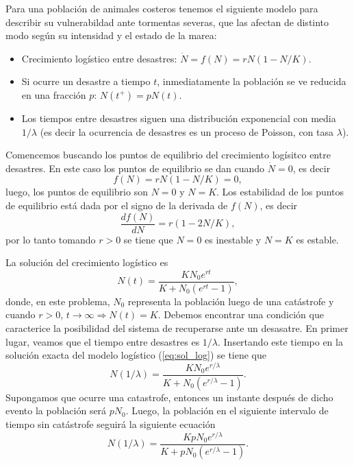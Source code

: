 \documentclass[letterpaper,12pt]{article}
\theoremstyle{plain}
\begin{document}
Para una población de animales costeros tenemos el siguiente modelo para describir su vulnerabildad ante tormentas severas, que las afectan de distinto modo según su intensidad y el estado de la marea:
\begin{itemize}
    \item Crecimiento logístico entre desastres: $ \dot{N} = f(N) = rN(1 - N/K)$.
    \item Si ocurre un desastre a tiempo $t$, inmediatamente la población se ve reducida en una fracción $p$: $N(t^+) = pN(t)$.
    \item Los tiempos entre desastres siguen una distribución exponencial con media $1/\lambda$ (es decir la ocurrencia de desastres es un proceso de Poisson, con tasa $\lambda$).
\end{itemize}
Comencemos buscando los puntos de equilibrio del crecimiento logísitco entre desastres. En este caso los puntos de equilibrio se dan cuando $\dot{N} = 0$, es decir
\begin{equation}
    f(N) = rN(1 - N/K) = 0,
\end{equation}
luego, los puntos de equilibrio son $N=0$ y $N=K$. Los estabilidad de los puntos de equilibrio está dada por el signo de la derivada de $f(N)$, es decir    
\begin{equation}
    \frac{d f(N)}{d N} = r(1 - 2N/K), 
\end{equation}
por lo tanto tomando $r>0$ se tiene que $N=0$ es inestable y $N=K$ es estable. 

La solución del crecimiento logístico es
\begin{equation}
    N(t) = \frac{K N_0 e^{rt}}{K + N_0(e^{rt} - 1)},
    \label{eq:sol_log}
\end{equation}
donde, en este problema, $N_0$ representa la población luego de una catástrofe y cuando $r>0$, $t\rightarrow\infty \Rightarrow N(t) = K$. Debemos encontrar una condición que caracterice la posibilidad del sistema de recuperarse ante un desasatre. En primer lugar, veamos que el tiempo entre desastres es $1/\lambda$. Insertando este tiempo en la solución exacta del modelo logístico (\ref*{eq:sol_log}) se tiene que 
\begin{equation}
    N(1/\lambda) = \frac{K N_0 e^{r/\lambda}}{K + N_0(e^{r/\lambda} - 1)}.
\end{equation}
Supongamos que ocurre una catastrofe, entonces un instante después de dicho evento la población será $pN_0$. Luego, la población en el siguiente intervalo de tiempo sin catástrofe seguirá la siguiente ecuación
\begin{equation}
    N(1/\lambda) = \frac{K p N_0 e^{r/\lambda}}{K + p N_0 (e^{r/\lambda} - 1)}.
\end{equation}
\end{document}
